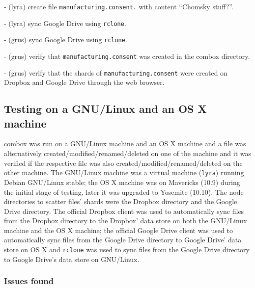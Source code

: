  - (lyra) create file \verb+manufacturing.consent.+ with content ``Chomsky stuff?''.

 - (lyra) sync Google Drive using \verb+rclone+.

 - (grus) sync Google Drive using \verb+rclone+.

 - (grus) verify that \verb+manufacturing.consent+ was created in the
 combox directory.

 - (grus) verify that the shards of \verb+manufacturing.consent+ were
 created on Dropbox and Google Drive through the web browser.

\subsection{Testing on a GNU/Linux and an OS X machine}

combox was run on a GNU/Linux machine and an OS X machine and a file
was alternatively created/modified/renamed/deleted on one of the
machine and it was verified if the respective file was also
created/modified/renamed/deleted on the other machine. The GNU/Linux
machine was a virtual machine (\verb+lyra+) running Debian GNU/Linux
stable; the OS X machine was on Mavericks (10.9) during the initial
stage of testing, later it was upgraded to Yosemite (10.10). The node
directories to scatter files' shards were the Dropbox directory and
the Google Drive directory. The official Dropbox client was used to
automatically sync files from the Dropbox directory to the Dropbox'
data store on both the GNU/Linux machine and the OS X machine; the
official Google Drive client was used to automatically sync files from
the Google Drive directory to Google Drive' data store on OS X and
\verb+rclone+\cite{program:rclone} was used to sync files from the
Google Drive directory to Google Drive's data store on GNU/Linux.

\subsubsection{Issues found}

